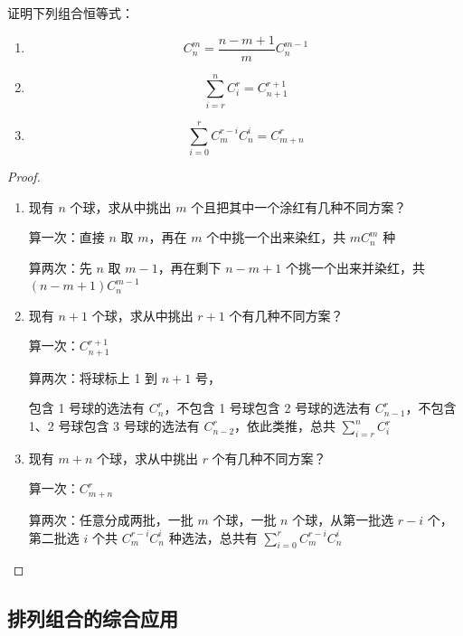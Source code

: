 \begin{example}证明下列组合恒等式：

    \begin{enumerate}
        \item \[C_n^m = \frac{n-m+1}{m} C_n^{m-1}\]
        \item \[\sum_{i=r}^{n} C_i^r = C_{n+1}^{r+1}\]
        \item \[\sum_{i=0}^{r} C_m^{r-i} C_n^i = C_{m+n}^r\]
    \end{enumerate}
\end{example}

\begin{proof}
    \begin{enumerate}
        \item 现有 \( n \) 个球，求从中挑出 \( m \) 个且把其中一个涂红有几种不同方案？

        算一次：直接 \( n \) 取 \( m \)，再在 \( m \) 个中挑一个出来染红，共 \( m C_n^m \) 种
        
        算两次：先 \( n \) 取 \( m-1 \)，再在剩下 \( n-m+1 \) 个挑一个出来并染红，共 \( (n-m+1) C_n^{m-1} \)
        \item 现有 \( n+1 \) 个球，求从中挑出 \( r+1 \) 个有几种不同方案？

        算一次：\( C_{n+1}^{r+1} \)
        
        算两次：将球标上 1 到 \( n+1 \) 号，
        
        包含 1 号球的选法有 \( C_n^r \)，不包含 1 号球包含 2 号球的选法有 \( C_{n-1}^r \)，不包含 1、2 号球包含 3 号球的选法有 \( C_{n-2}^r \)，依此类推，总共 \( \sum_{i=r}^{n} C_i^r \)
        \item 现有 \( m+n \) 个球，求从中挑出 \( r \) 个有几种不同方案？

        算一次：\( C_{m+n}^r \)
        
        算两次：任意分成两批，一批 \( m \) 个球，一批 \( n \) 个球，从第一批选 \( r-i \) 个，第二批选 \( i \) 个共 \( C_m^{r-i} C_n^i \) 种选法，总共有 \( \sum_{i=0}^{r} C_m^{r-i} C_n^i \)
    \end{enumerate}
\end{proof}





\clearpage
\subsection{排列组合的综合应用}













